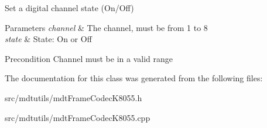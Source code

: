 Set a digital channel state (On/Off) 


\begin{DoxyParams}{Parameters}
{\em channel} & The channel, must be from 1 to 8 \\
\hline
{\em state} & State: On or Off \\
\hline
\end{DoxyParams}
\begin{DoxyPrecond}{Precondition}
Channel must be in a valid range 
\end{DoxyPrecond}


The documentation for this class was generated from the following files:\begin{DoxyCompactItemize}
\item 
src/mdtutils/mdtFrameCodecK8055.h\item 
src/mdtutils/mdtFrameCodecK8055.cpp\end{DoxyCompactItemize}
